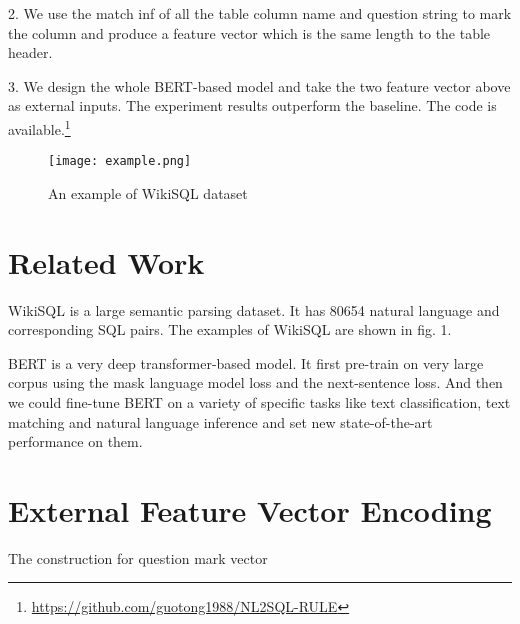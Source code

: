 \documentclass{llncs}
\begin{document}
2. We use the match inf of all the table column name and question string to mark the column and produce a feature vector which is the same length to the table header. 

3. We design the whole BERT-based model and take the two feature vector above as external inputs. The experiment results outperform the baseline\cite{ref_proc3}. The code is available.\footnote[1]{\url{https://github.com/guotong1988/NL2SQL-RULE}}

\begin{figure}
\centering
\texttt{[image: example.png]}
\caption{An example of WikiSQL dataset} \label{fig1}
\end{figure}

\section{Related Work}

WikiSQL \cite{ref_proc1} is a large semantic parsing dataset. It has 80654 natural language and corresponding SQL pairs. The examples of WikiSQL are shown in fig. 1. 

BERT\cite{ref_proc4} is a very deep transformer-based\cite{ref_proc5} model. It first pre-train on very large corpus using the mask language model loss and the next-sentence loss. And then we could fine-tune BERT on a variety of specific tasks like text classification, text matching and natural language inference and set new state-of-the-art performance on them. 


\section{External Feature Vector Encoding}


\begin{algorithm}
\caption{The construction for question mark vector}
\label{alg:A}
\begin{algorithmic}
\ENDIF
\ENDFOR

\ENDIF
\ENDFOR

\end{algorithmic}
\end{algorithm}
\end{document}
